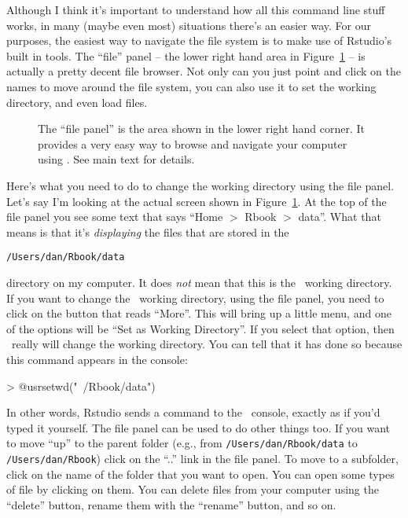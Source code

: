 
Although I think it's important to understand how all this command line stuff works, in many (maybe even most) situations there's an easier way. For our purposes, the easiest way to navigate the file system is to make use of Rstudio's built in tools. The ``file'' panel -- the lower right hand area in Figure~\ref{fig:filepanel} -- is actually a pretty decent file browser. Not only can you just point and click on the names to move around the file system, you can also use it to set the working directory, and even load files. 

\begin{figure}[t]
\begin{center}
\caption{The ``file panel'' is the area shown in the lower right hand corner. It provides a very easy way to browse and navigate your computer using \R. See main text for details.}
\HR
\label{fig:filepanel}
\end{center}
\end{figure}


Here's what you need to do to change the working directory using the file panel. Let's say I'm looking at the actual screen shown in Figure~\ref{fig:filepanel}. At the top of the file panel you see some text that says ``Home $>$ Rbook $>$ data''. What that means is that it's {\it displaying} the files that are stored in the 
\begin{verbatim}
/Users/dan/Rbook/data
\end{verbatim}
directory on my computer. It does {\it not} mean that this is the \R\ working directory. If you want to change the \R\ working directory, using the file panel, you need to click on the button that reads ``More''. This will bring up a little menu, and one of the options will be ``Set as Working Directory''. If you select that option, then \R\ really will change the working directory. You can tell that it has done so because this command appears in the console: 
\begin{rblock1}
> @usr{setwd("~/Rbook/data")}
\end{rblock1}
In other words, Rstudio sends a command to the \R\ console, exactly as if you'd typed it yourself. The file panel can be used to do other things too. If you want to move ``up'' to the parent folder (e.g., from \texttt{/Users/dan/Rbook/data} to \texttt{/Users/dan/Rbook}) click on the ``..'' link in the file panel. To move to a subfolder, click on the name of the folder that you want to open. You can open some types of file by clicking on them. You can delete files from your computer using the ``delete'' button, rename them with the ``rename'' button, and so on.


